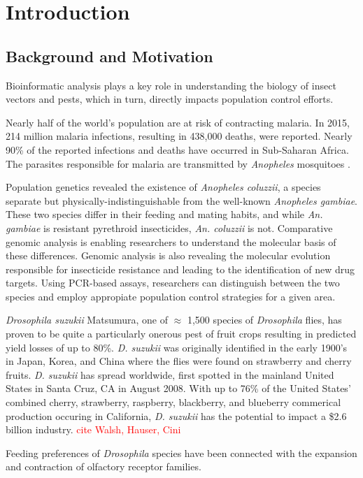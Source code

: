 \chapter{Introduction}

\section{Background and Motivation}
Bioinformatic analysis plays a key role in understanding the biology of insect vectors and pests, which in turn, directly impacts population control efforts.

Nearly half of the world's population are at risk of contracting malaria.  In 2015, 214 million malaria infections, resulting in 438,000 deaths, were reported. Nearly 90\% of the reported infections and deaths have occurred in Sub-Saharan Africa.  The parasites responsible for malaria are transmitted by \emph{Anopheles} mosquitoes \cite{Fournier2002}.

Population genetics revealed the existence of \emph{Anopheles coluzzii}, a species separate but physically-indistinguishable from the well-known \emph{Anopheles gambiae}. These two species differ in their feeding and mating habits, and while \emph{An. gambiae} is resistant pyrethroid insecticides, \emph{An. coluzzii} is not.  Comparative genomic analysis is enabling researchers to understand the molecular basis of these differences.  Genomic analysis is also revealing the molecular evolution responsible for insecticide resistance and leading to the identification of new drug targets.  Using PCR-based assays, researchers can distinguish between the two species and employ appropiate population control strategies for a given area. 

\emph{Drosophila suzukii} Matsumura, one of $\approx$ 1,500 species of \emph{Drosophila} flies, has proven to be quite a particularly onerous pest of fruit crops resulting in predicted yield losses of up to 80\%.  \emph{D. suzukii} was originally identified in the early 1900's in Japan, Korea, and China where the flies were found on strawberry and cherry fruits. \emph{D. suzukii} has spread worldwide, first spotted in the mainland United States in Santa Cruz, CA in August 2008. With up to 76\% of the United States' combined cherry, strawberry, raspberry, blackberry, and blueberry commerical production occuring in California, \emph{D. suzukii} has the potential to impact a \$2.6 billion industry. \textcolor{red}{cite Walsh, Hauser, Cini}

Feeding preferences of \emph{Drosophila} species have been connected with the expansion and contraction of olfactory receptor families.

